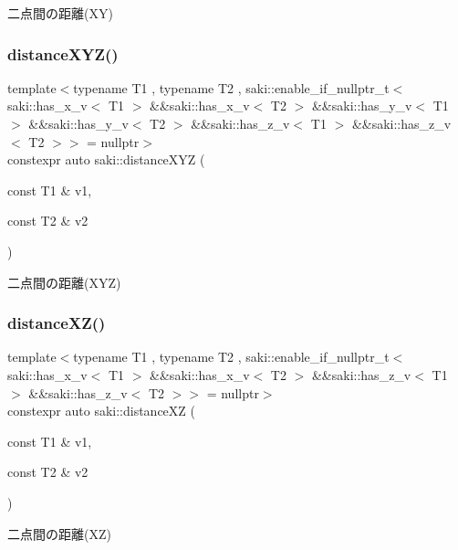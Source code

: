二点間の距離(\+X\+Y) 

\mbox{\label{namespacesaki_af202425b916b22c2b3a26731689d5c21}} 
\subsubsection{\texorpdfstring{distance\+X\+Y\+Z()}{distanceXYZ()}}
{\footnotesize\ttfamily template$<$typename T1 , typename T2 , saki\+::enable\+\_\+if\+\_\+nullptr\+\_\+t$<$ saki\+::has\+\_\+x\+\_\+v$<$ T1 $>$ \&\&saki\+::has\+\_\+x\+\_\+v$<$ T2 $>$ \&\&saki\+::has\+\_\+y\+\_\+v$<$ T1 $>$ \&\&saki\+::has\+\_\+y\+\_\+v$<$ T2 $>$ \&\&saki\+::has\+\_\+z\+\_\+v$<$ T1 $>$ \&\&saki\+::has\+\_\+z\+\_\+v$<$ T2 $>$$>$  = nullptr$>$ \\
constexpr auto saki\+::distance\+X\+YZ (\begin{DoxyParamCaption}\item[{const T1 \&}]{v1,  }\item[{const T2 \&}]{v2 }\end{DoxyParamCaption})}



二点間の距離(\+X\+Y\+Z) 

\mbox{\label{namespacesaki_a6bd1999d77d0ba6f6101747d82593c66}} 
\subsubsection{\texorpdfstring{distance\+X\+Z()}{distanceXZ()}}
{\footnotesize\ttfamily template$<$typename T1 , typename T2 , saki\+::enable\+\_\+if\+\_\+nullptr\+\_\+t$<$ saki\+::has\+\_\+x\+\_\+v$<$ T1 $>$ \&\&saki\+::has\+\_\+x\+\_\+v$<$ T2 $>$ \&\&saki\+::has\+\_\+z\+\_\+v$<$ T1 $>$ \&\&saki\+::has\+\_\+z\+\_\+v$<$ T2 $>$$>$  = nullptr$>$ \\
constexpr auto saki\+::distance\+XZ (\begin{DoxyParamCaption}\item[{const T1 \&}]{v1,  }\item[{const T2 \&}]{v2 }\end{DoxyParamCaption})}



二点間の距離(\+X\+Z) 

\mbox{\label{namespacesaki_a708a45bd2134a3a276e7acb2566eb8c1}} 

